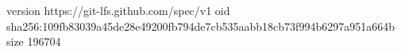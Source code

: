 version https://git-lfs.github.com/spec/v1
oid sha256:109fb83039a45de28e49200fb794de7cb535aabb18cb73f994b6297a951a664b
size 196704
